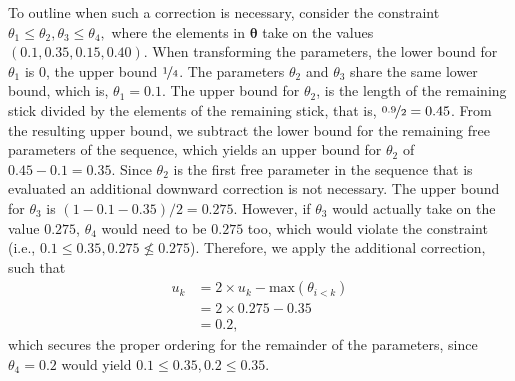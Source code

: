 \documentclass[
  english,
  man,floatsintext]{apa6}
\begin{document}
To outline when such a correction is necessary, consider the constraint \(\theta_1 \leq \theta_2, \theta_3 \leq \theta_4,\) where the elements in \(\boldsymbol{\theta}\) take on the values \((0.1, 0.35, 0.15, 0.40)\). When transforming the parameters, the lower bound for \(\theta_1\) is \(0\), the upper bound \(\nicefrac{1}{4}\). The parameters \(\theta_2\) and \(\theta_3\) share the same lower bound, which is, \(\theta_1 = 0.1\). The upper bound for \(\theta_2\), is the length of the remaining stick divided by the elements of the remaining stick, that is, \(\nicefrac{0.9}{2} = 0.45\). From the resulting upper bound, we subtract the lower bound for the remaining free parameters of the sequence, which yields an upper bound for \(\theta_2\) of \(0.45 - 0.1 = 0.35\). Since \(\theta_2\) is the first free parameter in the sequence that is evaluated an additional downward correction is not necessary. The upper bound for \(\theta_3\) is \((1 - 0.1 - 0.35)/2 = 0.275\). However, if \(\theta_3\) would actually take on the value \(0.275\), \(\theta_4\) would need to be \(0.275\) too, which would violate the constraint (i.e., \(0.1 \leq 0.35, 0.275 \nleq 0.275\)). Therefore, we apply the additional correction, such that
\begin{align}
  u_k &= 2 \times u_k - \text{max}(\theta_{i < k}) \\
      &= 2 \times 0.275 - 0.35 \\
      &= 0.2,
\end{align}
which secures the proper ordering for the remainder of the parameters, since \(\theta_4 = 0.2\) would yield \(0.1 \leq 0.35, 0.2 \leq 0.35\).
\end{document}
